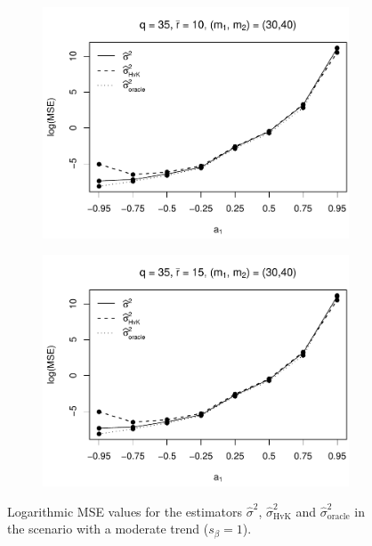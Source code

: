 \begin{figure}[p]
\begin{subfigure}[b]{0.45\textwidth}
\includegraphics[width=\textwidth]{Plots/Robustness/MSE_lrv_T=500_slope=1_(q,r,M1,M2)=(35,10,30,40).pdf}
\end{subfigure}
\hspace{0.25cm}
\begin{subfigure}[b]{0.45\textwidth}
\includegraphics[width=\textwidth]{Plots/Robustness/MSE_lrv_T=500_slope=1_(q,r,M1,M2)=(35,15,30,40).pdf}
\end{subfigure}
\caption{Logarithmic MSE values for the estimators $\widehat{\sigma}^2$, $\widehat{\sigma}^2_{\text{HvK}}$ and $\widehat{\sigma}^2_{\text{oracle}}$ in the scenario with a moderate trend ($s_\beta=1$).}\label{fig:MSE_slope1_lrv_robust}
\end{figure}


